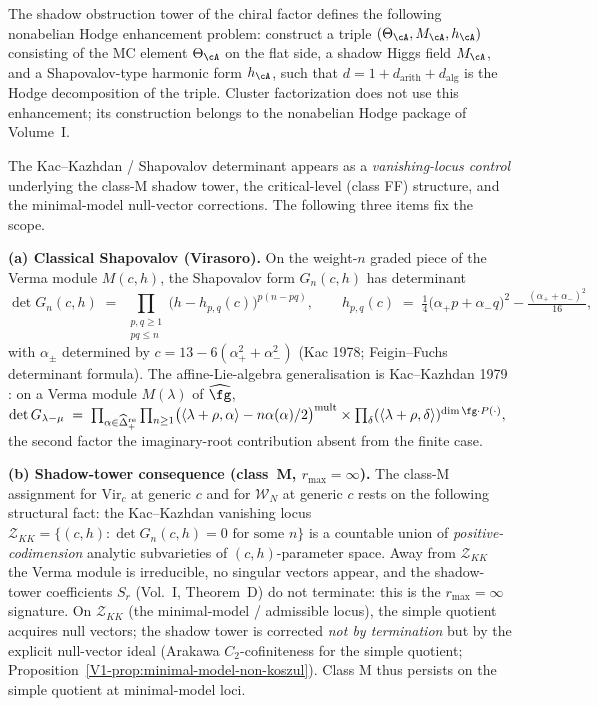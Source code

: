\begin{remark}
\label{rem:nonabelian_hodge_shadow}
The shadow obstruction tower of the chiral factor defines the following
nonabelian Hodge enhancement problem: construct a triple
$(\Theta_\cA,M_\cA,h_\cA)$ consisting of the MC element
$\Theta_\cA$ on the flat side, a shadow Higgs field $M_\cA$, and a
Shapovalov-type harmonic form $h_\cA$, such that
$d=1+d_{\mathrm{arith}}+d_{\mathrm{alg}}$ is the Hodge decomposition of
the triple. Cluster factorization does not use this enhancement; its
construction belongs to the nonabelian Hodge package of Volume~I.
\end{remark}

\begin{remark}
\label{rem:shapovalov-determinant-scope}
%
The Kac--Kazhdan / Shapovalov determinant appears as a
\emph{vanishing-locus control} underlying the class-M shadow tower,
the critical-level (class FF) structure, and the minimal-model
null-vector corrections. The following three items fix the scope.

\smallskip
\textbf{(a) Classical Shapovalov (Virasoro).} On the weight-$n$ graded piece
of the Verma module $M(c,h)$, the Shapovalov form $G_n(c,h)$ has determinant
\[
\det G_n(c,h) \;=\; \prod_{\substack{p,q\ge 1\\ pq\le n}}
 \bigl(h - h_{p,q}(c)\bigr)^{p(n-pq)},
\qquad
h_{p,q}(c) \;=\; \tfrac{1}{4}\bigl(\alpha_+ p + \alpha_- q\bigr)^2 - \tfrac{(\alpha_+ + \alpha_-)^2}{16},
\]
with $\alpha_\pm$ determined by $c = 13 - 6(\alpha_+^2 + \alpha_-^2)$
(Kac 1978; Feigin--Fuchs determinant formula).
The affine-Lie-algebra generalisation is Kac--Kazhdan 1979
\cite{KacKazhdan79}: on a Verma module $M(\lambda)$ of $\widehat\fg$,
\(
\det G_{\lambda - \mu} \;=\;
\prod_{\alpha \in \widehat\Delta_+^{\mathrm{re}}}\prod_{n\ge 1}
 \bigl(\langle \lambda+\rho, \alpha\rangle - n\alpha(\alpha)/2\bigr)^{\mathrm{mult}}
\times
\prod_{\delta}(\langle\lambda+\rho,\delta\rangle)^{\dim \fg \cdot P(\cdot)},
\)
the second factor the imaginary-root contribution absent from the finite case.

\smallskip
\textbf{(b) Shadow-tower consequence (class~M, $r_{\max}=\infty$).}
The class-M assignment for Vir$_c$ at generic $c$ and for
$\mathcal W_N$ at generic $c$ rests on the following structural fact:
the Kac--Kazhdan vanishing locus
$\mathcal Z_{KK} = \{(c,h) : \det G_n(c,h) = 0\text{ for some }n\}$
is a countable union of \emph{positive-codimension} analytic subvarieties
of $(c,h)$-parameter space. Away from $\mathcal Z_{KK}$ the Verma module
is irreducible, no singular vectors appear, and the shadow-tower
coefficients $S_r$ (Vol.~I, Theorem~D) do not terminate: this is the
$r_{\max}=\infty$ signature. On $\mathcal Z_{KK}$ (the minimal-model / admissible
locus), the simple quotient acquires null vectors; the shadow tower is
corrected \emph{not by termination} but by the explicit null-vector ideal
(Arakawa $C_2$-cofiniteness for the simple quotient;
Proposition~\ref*{V1-prop:minimal-model-non-koszul}).
Class M thus persists on the simple quotient at minimal-model loci.


\end{remark}

